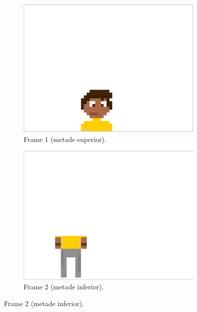 \begin{figure}[htbp]
    \centering
    \caption{\small Animação gerada pelo Rosebud AI}
    \label{fig:rosebudAnimacao}
    
    \begin{subfigure}{0.45\linewidth}
        \includegraphics[width=1\linewidth]{figs/rosebud/rosebud_resultado_tela3_1.PNG}
        \caption{\small Frame 1 (metade superior).}
        \label{fig:rosebudFrame1}
    \end{subfigure}
    \begin{subfigure}{0.45\linewidth}
        \includegraphics[width=1\linewidth]{figs/rosebud/rosebud_resultado_tela3_2.PNG}
        \caption{\small Frame 2 (metade inferior).}
        \label{fig:rosebudFrame2}
    \end{subfigure}

\end{figure}

